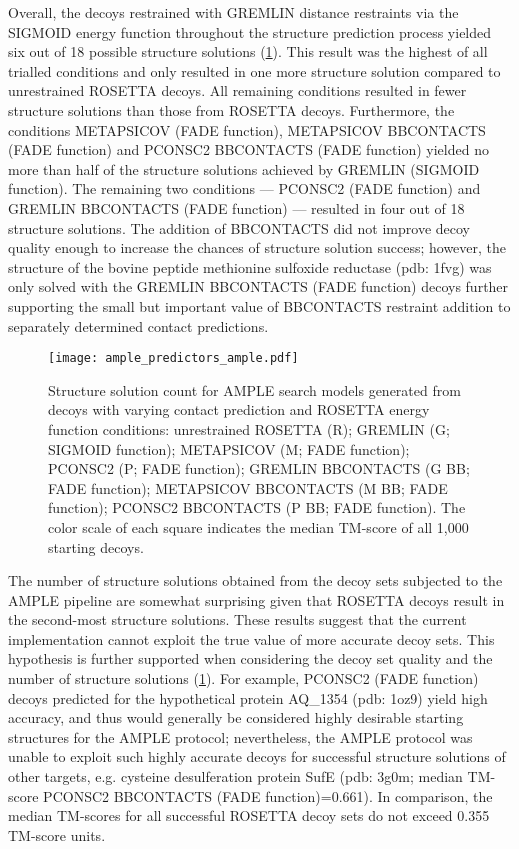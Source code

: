 Overall, the decoys restrained with GREMLIN distance restraints via the SIGMOID energy function throughout the structure prediction process yielded six out of 18 possible structure solutions (\cref{fig:ample_predictor_ample}). This result was the highest of all trialled conditions and only resulted in one more structure solution compared to unrestrained ROSETTA decoys. All remaining conditions resulted in fewer structure solutions than those from ROSETTA decoys. Furthermore, the conditions METAPSICOV (FADE function), METAPSICOV BBCONTACTS (FADE function) and PCONSC2 BBCONTACTS (FADE function) yielded no more than half of the structure solutions achieved by GREMLIN (SIGMOID function). The remaining two conditions --- PCONSC2 (FADE function) and GREMLIN BBCONTACTS (FADE function) --- resulted in four out of 18 structure solutions. The addition of BBCONTACTS did not improve decoy quality enough to increase the chances of structure solution success; however, the structure of the bovine peptide methionine sulfoxide reductase (\gls{pdb}: 1fvg) was only solved with the GREMLIN BBCONTACTS (FADE function) decoys further supporting the small but important value of BBCONTACTS restraint addition to separately determined contact predictions.

\begin{figure}[H]
    \centering
    \texttt{[image: ample\_predictors\_ample.pdf]}
    \caption{Structure solution count for AMPLE search models generated from decoys with varying contact prediction and ROSETTA energy function conditions: unrestrained ROSETTA (R); GREMLIN (G; SIGMOID function); METAPSICOV (M; FADE function); PCONSC2  (P; FADE function); GREMLIN BBCONTACTS (G BB; FADE function); METAPSICOV BBCONTACTS (M BB; FADE function); PCONSC2 BBCONTACTS (P BB; FADE function). The color scale of each square indicates the median TM-score of all 1,000 starting decoys.}
    \label{fig:ample_predictor_ample}
\end{figure}

The number of structure solutions obtained from the decoy sets subjected to the AMPLE pipeline are somewhat surprising given that ROSETTA decoys result in the second-most structure solutions. These results suggest that the current implementation cannot exploit the true value of more accurate decoy sets. This hypothesis is further supported when considering the decoy set quality and the number of structure solutions (\cref{fig:ample_predictor_ample}). For example, PCONSC2 (FADE function) decoys predicted for the hypothetical protein AQ\_1354 (\gls{pdb}: 1oz9) yield high accuracy, and thus would generally be considered highly desirable starting structures for the AMPLE protocol; nevertheless, the AMPLE protocol was unable to exploit such highly accurate decoys for successful structure solutions of other targets, e.g. cysteine desulferation protein SufE (\gls{pdb}: 3g0m; median TM-score PCONSC2 BBCONTACTS (FADE function)=0.661). In comparison, the median TM-scores for all successful ROSETTA decoy sets do not exceed 0.355 TM-score units.

